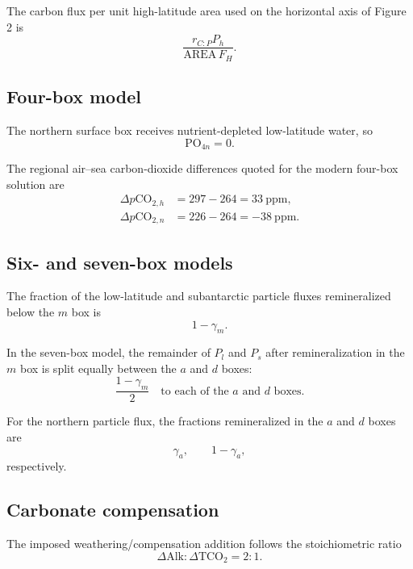 \documentclass[11pt]{article}
\newcommand{\TCO}[1]{\mathrm{TCO}_{2#1}}
\newcommand{\PO}[1]{\mathrm{PO}_{4#1}}
\newcommand{\pCO}[1]{p\mathrm{CO}_{2#1}}
\begin{document}
The carbon flux per unit high-latitude area used on the horizontal axis of Figure 2 is
\begin{equation*}
\frac{r_{C:P}P_h}{\mathrm{AREA}\,F_H}.
\end{equation*}

\subsection*{Four-box model}

The northern surface box receives nutrient-depleted low-latitude water, so
\begin{equation*}
\PO{n}=0.
\end{equation*}

The regional air--sea carbon-dioxide differences quoted for the modern four-box solution are
\begin{align*}
\Delta\pCO{,h} &= 297-264=33\ \mathrm{ppm},\\
\Delta\pCO{,n} &= 226-264=-38\ \mathrm{ppm}.
\end{align*}

\subsection*{Six- and seven-box models}

The fraction of the low-latitude and subantarctic particle fluxes remineralized below the $m$ box is
\begin{equation*}
1-\gamma_m.
\end{equation*}

In the seven-box model, the remainder of $P_l$ and $P_s$ after remineralization in the $m$ box is split equally between the $a$ and $d$ boxes:
\begin{equation*}
\frac{1-\gamma_m}{2}
\quad\text{to each of the $a$ and $d$ boxes.}
\end{equation*}

For the northern particle flux, the fractions remineralized in the $a$ and $d$ boxes are
\begin{equation*}
\gamma_a,
\qquad
1-\gamma_a,
\end{equation*}
respectively.

\subsection*{Carbonate compensation}

The imposed weathering/compensation addition follows the stoichiometric ratio
\begin{equation*}
\Delta\mathrm{Alk}:\Delta\TCO{}=2:1.
\end{equation*}
\end{document}
